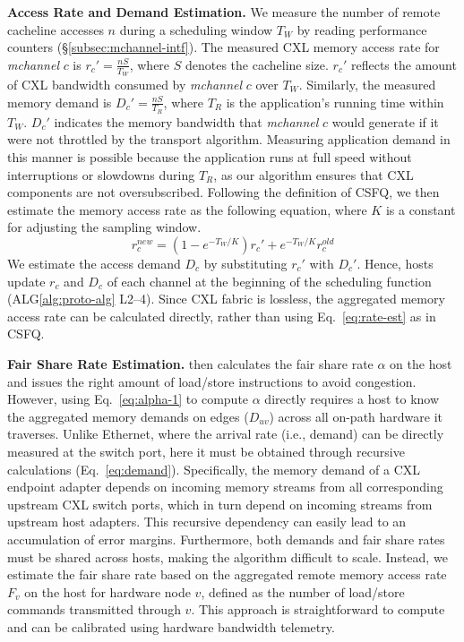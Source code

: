 \noindent
{\bf Access Rate and Demand Estimation.} 
We measure the number of remote cacheline accesses \(n\) during a scheduling window \(T_W\) by reading performance counters (§\ref{subsec:mchannel-intf}). %
The measured CXL memory access rate for \textit{mchannel} \(c\) is \(r_c' = \frac{nS}{T_W}\), where \(S\) denotes the cacheline size. \(r_c'\) reflects the amount of CXL bandwidth consumed by \textit{mchannel} \(c\) over \(T_W\). Similarly, the measured memory demand is \(D_c' = \frac{nS}{T_R}\), where \(T_R\) is the application’s running time within \(T_W\). \(D_c'\) indicates the memory bandwidth that \textit{mchannel} \(c\) would generate if it were not throttled by the transport algorithm. Measuring application demand in this manner is possible because the application runs at full speed without interruptions or slowdowns during \(T_R\), as our algorithm ensures that CXL components are not oversubscribed. Following the definition of CSFQ, we then estimate the memory access rate as the following equation, where \(K\) is a constant for adjusting the sampling window.
\begin{equation}
\label{eq:rate-est}
    r_c^{new} = (1-e^{-T_W/K}) r_c' + e^{-T_W/K} r_c^{old}
\end{equation}
We estimate the access demand \(D_c\) by substituting \(r_c'\) with \(D_c'\). Hence, hosts update \(r_c\) and \(D_c\) of each channel at the beginning of the scheduling function (ALG\ref{alg:proto-alg} L2–4). Since CXL fabric is lossless, the aggregated memory access rate can be calculated directly, rather than using Eq.~\ref{eq:rate-est} as in CSFQ.

\noindent
{\bf Fair Share Rate Estimation.} \sys then calculates the fair share rate \(\alpha\) on the host and issues the right amount of load/store instructions to avoid congestion. However, using Eq.~\ref{eq:alpha-1} to compute \(\alpha\) directly requires a host to know the aggregated memory demands on edges (\(D_{uv}\)) across all on-path hardware it traverses. Unlike Ethernet, where the arrival rate (i.e., demand) can be directly measured at the switch port, here it must be obtained through recursive calculations (Eq.~\ref{eq:demand}). Specifically, the memory demand of a CXL endpoint adapter depends on incoming memory streams from all corresponding upstream CXL switch ports, which in turn depend on incoming streams from upstream host adapters. This recursive dependency can easily lead to an accumulation of error margins. Furthermore, both demands and fair share rates must be shared across hosts, making the algorithm difficult to scale. Instead, we estimate the fair share rate based on the aggregated remote memory access rate \(F_v\) on the host for hardware node \(v\), defined as the number of load/store commands transmitted through \(v\). This approach is straightforward to compute and can be calibrated using hardware bandwidth telemetry.

